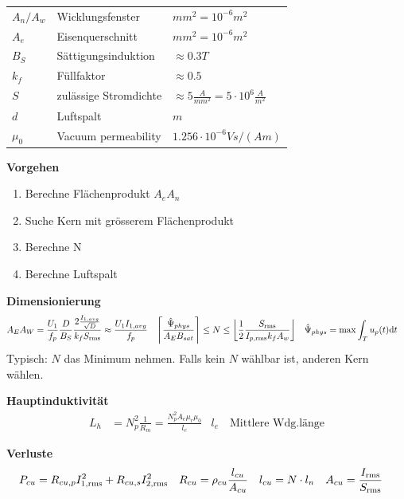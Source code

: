 \documentclass[10pt,landscape]{scrartcl}
\begin{document}
\begin{multicols}{2}
\begin{minipage}[h]{0.6\linewidth}
  \begin{tabular}{l l l |}
    $A_n/A_w$   & Wicklungsfenster      & $mm^2 = 10^{-6}m^2$ \\
    $A_e$   & Eisenquerschnitt      & $mm^2 = 10^{-6}m^2$ \\
    $B_S$   & Sättigungsinduktion   & $\approx 0.3T$ \\
    $k_f$   & Füllfaktor            & $\approx 0.5$ \\
    $S$     & zulässige Stromdichte & $\approx 5\frac{A}{mm^2}=5\cdot10^6\frac{A}{m^2}$ \\
    $d$     & Luftspalt             & $m$ \\
    $\mu_0$ & Vacuum permeability   & $1.256\cdot10^{-6}Vs/(Am)$
  \end{tabular}
\end{minipage}
\begin{minipage}[h]{0.3\linewidth}
\textbf{Vorgehen}
  \begin{enumerate}
    \item Berechne Flächenprodukt $A_e A_n$
    \item Suche Kern mit grösserem Flächenprodukt
    \item Berechne N
    \item Berechne Luftspalt
  \end{enumerate}
\end{minipage}

\textbf{Dimensionierung}
\begin{align*}
  A_EA_W &= \frac{U_1}{f_p}\frac{D}{B_S}\frac{2\frac{I_{1,avg}}{\sqrt{D}}}{k_f S_{\textup{rms}}} \approx \frac{U_1I_{1,avg}}{f_p} & 
  \left\lceil \frac{\hat{\Psi}_{phys}}{A_EB_{sat}} \right\rceil &\leq N \leq
  \left\lfloor \frac{1}{2}\frac{S_{\textup{rms}}}{I_{p,\textup{rms}}k_f A_w} \right\rfloor &
  \hat{\Psi}_{phys} &= \max\int_{T}^{}u_p(t)\mathrm{d}t
\end{align*}
Typisch: $N$ das Minimum nehmen. Falls kein $N$ wählbar ist, anderen Kern wählen.

\textbf{Hauptinduktivität}
\begin{align*}
  L_h &= N_p^2\frac{1}{R_m} = \frac{N_p^2A_e\mu_r\mu_0}{l_e} & l_e \quad \text{Mittlere Wdg.länge}
\end{align*}

\textbf{Verluste}
\begin{align*}
  P_{cu} &= R_{cu,p}I_{1,\textup{rms}}^2+R_{cu,s}I_{2,\textup{rms}}^2 &
  R_{cu} &= \rho_{cu} \frac{l_{cu}}{A_{cu}} &
  l_{cu} &= N\cdot l_n &
  A_{cu} &= \frac{I_{\textup{rms}}}{S_{\textup{rms}}}
\end{align*}


\end{multicols}
\end{document}
